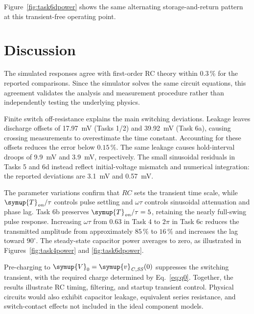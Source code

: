 \documentclass[12pt,a4paper]{article}
\begin{document}
	Figure~\ref{fig:task6dpower} shows the same alternating
	storage-and-return pattern at this transient-free operating point.
	
	\section{Discussion}
	\label{sec:discussion}
	The simulated responses agree with first-order RC theory within
	$0.3\,\%$ for the reported comparisons.  Since the simulator solves
	the same circuit equations, this agreement validates the analysis
	and measurement procedure rather than independently testing the
	underlying physics.
	
	Finite switch off-resistance explains the main switching deviations.
	Leakage leaves discharge offsets of \SI{17.97}{\milli\volt}
	(Tasks 1/2) and \SI{39.92}{\milli\volt} (Task 6a), causing crossing
	measurements to overestimate the time constant.  Accounting for
	these offsets reduces the error below $0.15\,\%$.  The same leakage
	causes hold-interval droops of \SI{9.9}{\milli\volt} and
	\SI{3.9}{\milli\volt}, respectively.  The small sinusoidal residuals
	in Tasks 5 and 6d instead reflect initial-voltage mismatch and
	numerical integration: the reported deviations are
	\SI{3.1}{\milli\volt} and \SI{0.57}{\milli\volt}.
	
	The parameter variations confirm that $RC$ sets the transient time
	scale, while $\symup{T}_{\mathit{on}}/\tau$ controls pulse settling and $\omega\tau$
	controls sinusoidal attenuation and phase lag.  Task 6b preserves
	$\symup{T}_{\mathit{on}}/\tau=5$, retaining the nearly full-swing pulse response.
	Increasing $\omega\tau$ from $0.63$ in Task 4 to $2\pi$ in Task 6c
	reduces the transmitted amplitude from approximately $85\,\%$ to
	$16\,\%$ and increases the lag toward $90^\circ$.
	The steady-state capacitor power averages to zero, as illustrated
	in Figures~\ref{fig:task4power} and \ref{fig:task6dpower}.
	
	Pre-charging to $\symup{V}_{0}=\symup{v}_{\mathit{C,SS}}(0)$ suppresses the switching
	transient, with the required charge determined by Eq.~\eqref{eq:q0}.
	Together, the results illustrate RC timing, filtering, and startup
	transient control.  Physical circuits would also exhibit capacitor
	leakage, equivalent series resistance, and switch-contact effects
	not included in the ideal component models.
	
\end{document}
